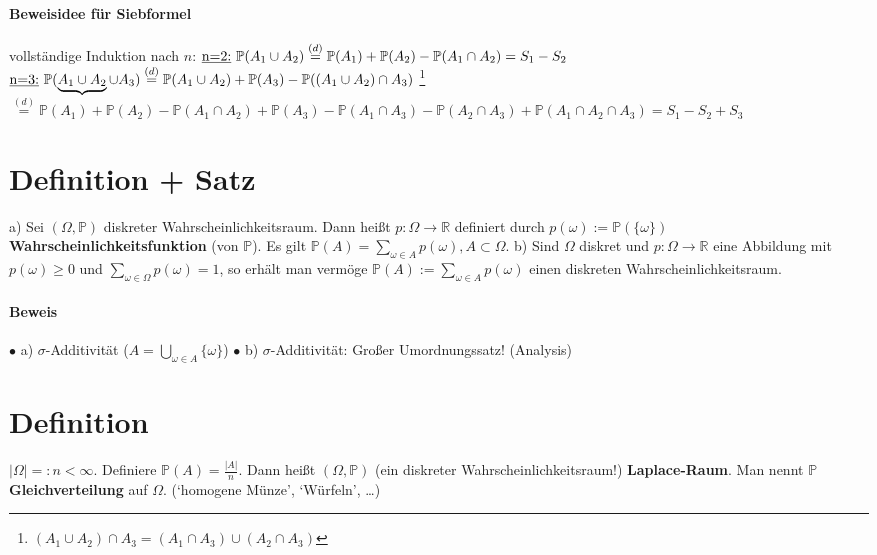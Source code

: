 \documentclass[a4paper,11pt,notitlepage]{report}
\newcommand{\R}{{\ensuremath{\mathbb{R}}}}
\newcommand{\Prim}{{\ensuremath{\mathbb{P}}}}
\begin{document}
\paragraph{Beweisidee für Siebformel}
vollständige Induktion nach $n$:
\newline
$\text{\underline{n=2:} }\Prim(A_1 \cup A_2) \overset{(d)}{=} \Prim(A_1) + \Prim(A_2) - \Prim(A_1 \cap A_2) = S_1 - S_2$
\newline
$\text{\underline{n=3:} }\Prim(\underbrace{A_1 \cup A_2} \cup A_3) \overset {(d)} {=} \Prim(A_1 \cup A_2) + \Prim(A_3) - \Prim((A_1 \cup A_2) \cap A_3)$ \footnote{$(A_1 \cup A_2) \cap A_3 = (A_1 \cap A_3) \cup (A_2 \cap A_3)$}
\newline
  $\overset {(d)} {=} \Prim(A_1) + \Prim(A_2) - \Prim(A_1 \cap A_2) + \Prim(A_3) - \Prim(A_1 \cap A_3) - \Prim(A_2 \cap A_3) + \Prim(A_1 \cap A_2 \cap A_3) = S_1 - S_2 + S_3$
  
\section{Definition + Satz}
a) Sei $(\Omega, \Prim)$ diskreter Wahrscheinlichkeitsraum. Dann heißt $p \colon \Omega \rightarrow \R$ definiert durch $p(\omega) := \Prim(\{\omega\})$ \textbf{Wahrscheinlichkeitsfunktion} (von $\Prim$).
\newline
Es gilt $\Prim(A) = \sum\limits_{\omega \in A}{p(\omega)}, A\subset \Omega$.
\newline
b) Sind $\Omega$ diskret und $p \colon \Omega \rightarrow \R$ eine Abbildung mit $p(\omega)\geq 0$ und $\sum\limits_{\omega \in \Omega}{p(\omega)} = 1$, so erhält man vermöge $\Prim(A):= \sum\limits_{\omega \in A}{p(\omega)}$ einen diskreten Wahrscheinlichkeitsraum.

\paragraph{Beweis}
$\bullet$ a) $\sigma$-Additivität ($A = \bigcup\limits_{\omega \in A}{\{\omega\}}$)
\newline
$\bullet$ b) $\sigma$-Additivität: Großer Umordnungssatz! (Analysis)

\section{Definition}
$|\Omega| =: n < \infty$. Definiere $\Prim(A)= \frac{|A|}{n}.$
Dann heißt $(\Omega, \Prim)$ (ein diskreter Wahrscheinlichkeitsraum!) \textbf{Laplace-Raum}. Man nennt $\Prim$ \textbf{Gleichverteilung} auf $\Omega$. 
\newline
(`homogene Münze', `Würfeln', \ldots)
\end{document}
